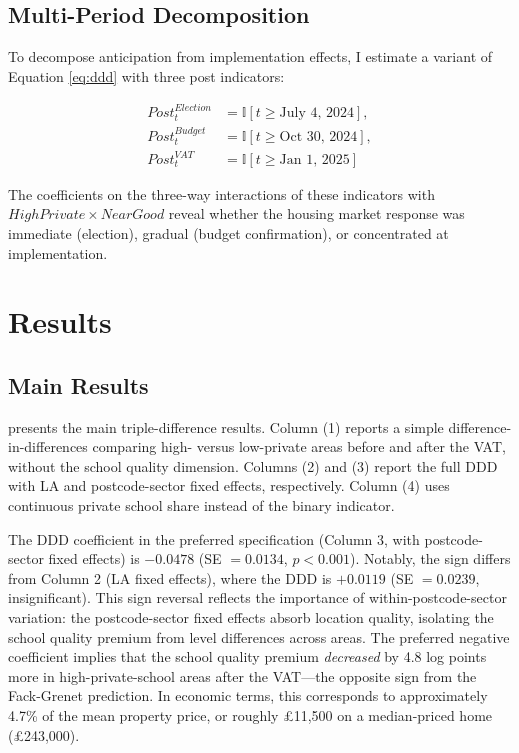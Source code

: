 \documentclass[12pt]{article}
\newcommand{\ind}{\mathbb{I}}
\begin{document}
\subsection{Multi-Period Decomposition}

To decompose anticipation from implementation effects, I estimate a variant of Equation \ref{eq:ddd} with three post indicators:

\begin{align*}
    Post_t^{Election} &= \ind[t \geq \text{July 4, 2024}], \\
    Post_t^{Budget} &= \ind[t \geq \text{Oct 30, 2024}], \\
    Post_t^{VAT} &= \ind[t \geq \text{Jan 1, 2025}]
\end{align*}

The coefficients on the three-way interactions of these indicators with $HighPrivate \times NearGood$ reveal whether the housing market response was immediate (election), gradual (budget confirmation), or concentrated at implementation.


\section{Results}\label{sec:results}

\subsection{Main Results}



 presents the main triple-difference results. Column (1) reports a simple difference-in-differences comparing high- versus low-private areas before and after the VAT, without the school quality dimension. Columns (2) and (3) report the full DDD with LA and postcode-sector fixed effects, respectively. Column (4) uses continuous private school share instead of the binary indicator.

The DDD coefficient in the preferred specification (Column 3, with postcode-sector fixed effects) is $-0.0478$ (SE $= 0.0134$, $p < 0.001$). Notably, the sign differs from Column 2 (LA fixed effects), where the DDD is $+0.0119$ (SE $= 0.0239$, insignificant). This sign reversal reflects the importance of within-postcode-sector variation: the postcode-sector fixed effects absorb location quality, isolating the school quality premium from level differences across areas. The preferred negative coefficient implies that the school quality premium \textit{decreased} by 4.8 log points more in high-private-school areas after the VAT---the opposite sign from the Fack-Grenet prediction. In economic terms, this corresponds to approximately 4.7\% of the mean property price, or roughly \pounds11,500 on a median-priced home (\pounds243,000).
\end{document}
